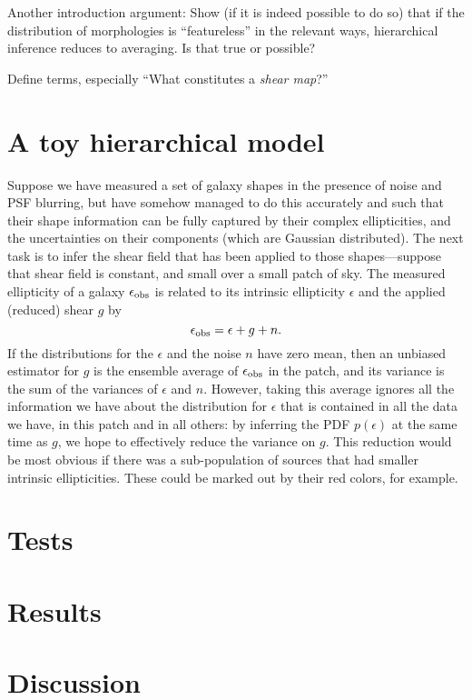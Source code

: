 \documentclass[12pt]{article}
\begin{document}
Another introduction argument: Show (if it is indeed possible to do
so) that if the distribution of morphologies is ``featureless'' in the
relevant ways, hierarchical inference reduces to averaging.  Is that
true or possible?

Define terms, especially ``What constitutes a \emph{shear map}?''

\section{A toy hierarchical model}

Suppose we have measured a set of galaxy shapes in the presence of noise and
PSF blurring, but have somehow managed to do this accurately and such that
their shape information can be fully captured by their complex ellipticities,
and the uncertainties on their components (which are Gaussian distributed).
The next task is to infer the shear field that has been applied to those
shapes---suppose that shear field is constant, and small over a small patch of
sky. The measured ellipticity of a galaxy $\epsilon_{\rm obs}$ 
is related to its intrinsic
ellipticity $\epsilon$ and the applied (reduced) shear $g$ by 
\begin{equation}
\epsilon_{\rm obs} = \epsilon + g + n.
\end{equation}
If the distributions for the $\epsilon$ and the noise $n$ have zero mean, then
an unbiased estimator for $g$ is the ensemble average of $\epsilon_{\rm obs}$
in the patch, and its variance is the sum of the variances of $\epsilon$ and
$n$. However, taking this average ignores all the information we have
about the distribution for $\epsilon$ that is contained in all the data we
have, in this patch and in all others: by inferring the PDF $p(\epsilon)$ at
the same time as $g$, we hope to effectively reduce the variance on $g$. This
reduction would be most obvious if there was a sub-population of sources that
had smaller intrinsic ellipticities. These could be marked out by their red
colors, for example.

\section{Tests}

\section{Results}

\section{Discussion}
\end{document}
